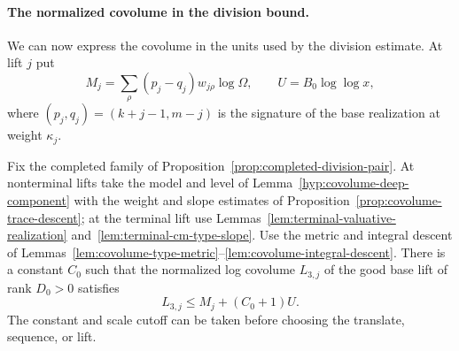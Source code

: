 

\paragraph{The normalized covolume in the division bound.}
We can now express the covolume in the units used by the division estimate. At lift
\(j\) put
\[
 M_j=\sum_\rho(p_j-q_j)w_{j\rho}\log\Omega,
 \qquad U=B_0\log\log x ,
\]
where \((p_j,q_j)=(k+j-1,m-j)\) is the signature of the
base realization at weight \(\kappa_j\).

\begin{proposition}\label{prop:selected-base-covolume}
Fix the completed family of Proposition~\ref{prop:completed-division-pair}.
At nonterminal lifts take the model and level of
Lemma~\ref{hyp:covolume-deep-component} with the weight and
slope estimates of Proposition~\ref{prop:covolume-trace-descent};
at the terminal lift use Lemmas~\ref{lem:terminal-valuative-realization} and~\ref{lem:terminal-cm-type-slope}. Use the metric and
integral descent of Lemmas~\ref{lem:covolume-type-metric}--\ref{lem:covolume-integral-descent}.
There is a constant \(C_0\) such that the
normalized log covolume \(L_{3,j}\) of the good base lift of
rank \(D_0>0\) satisfies
\[
 L_{3,j}\le M_j+(C_0+1)U .
\]
The constant and scale cutoff can be taken before choosing the
translate, sequence, or lift.
\end{proposition}

